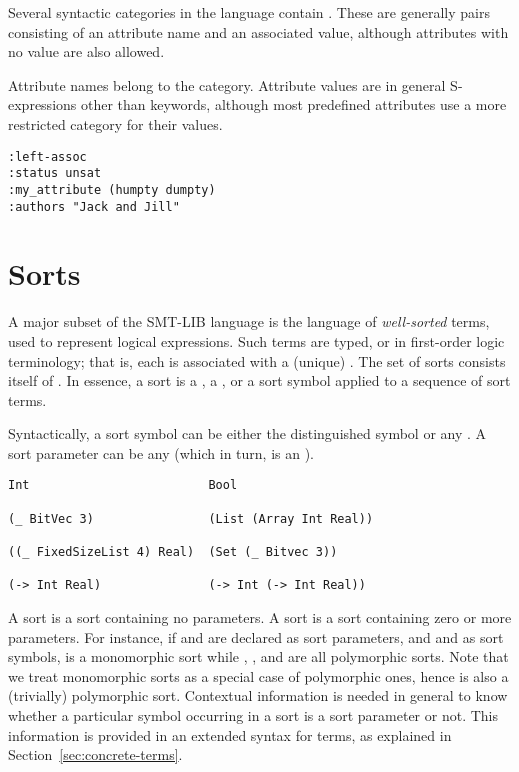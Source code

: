 Several syntactic categories in the language contain .
These are generally pairs consisting of an attribute name and an associated value,
although attributes with no value are also allowed.

Attribute names belong to the  category. 
Attribute values are in general S-expressions other than keywords,
although most predefined attributes use a more restricted category for 
their values.
\bigskip

\cAttributes
\bigskip

\begin{lstlisting}[linewidth=21em]
:left-assoc      
:status unsat
:my_attribute (humpty dumpty)
:authors "Jack and Jill"
\end{lstlisting}



\section{Sorts} \label{sec:concrete-sorts}

A major subset of the SMT-LIB language is 
the language of \emph{well-sorted} terms,
used to represent logical expressions.
Such terms are typed, or  in first-order logic terminology; 
that is, each is associated with a (unique) .
The set of sorts consists itself of .
In essence, a sort is 
a ,
a , 
or a sort symbol applied to a sequence of sort terms.

Syntactically, a sort symbol can be either the distinguished symbol 
or any . 
A sort parameter can be any  
(which in turn, is an ).
\bigskip

\cSorts
\medskip

\begin{lstlisting}[linewidth=35em]
Int                         Bool

(_ BitVec 3)                (List (Array Int Real))

((_ FixedSizeList 4) Real)  (Set (_ Bitvec 3))       

(-> Int Real)               (-> Int (-> Int Real))
\end{lstlisting}

A  sort is a sort containing no parameters.
A  sort is a sort containing zero or more parameters.
For instance, if  and  are declared as sort parameters,
and  and  as sort symbols,
 is a monomorphic sort 
while , , and  are
all polymorphic sorts.
Note that we treat monomorphic sorts as a special case of polymorphic ones,
hence  is also a (trivially) polymorphic sort.
Contextual information is needed in general to know whether a particular symbol
occurring in a sort is a sort parameter or not.
This information is provided in an extended syntax for terms, 
as explained in Section~\ref{sec:concrete-terms}.


